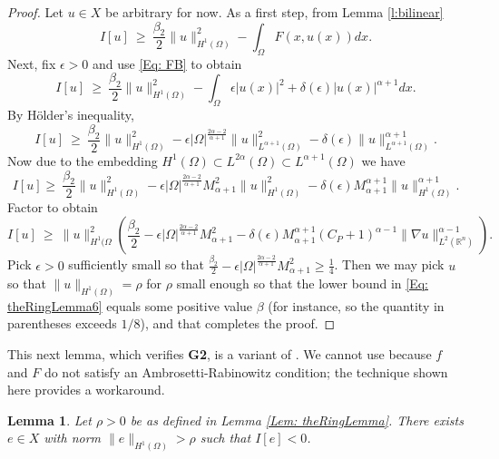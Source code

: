 \documentclass[11pt]{amsart}   	%
\theoremstyle{plain}
\numberwithin{equation}{section}
\newtheorem{lemma}[thm]{Lemma}
\def\al{\alpha}
\def\be{\beta}
\def\de{\delta}
\def\ep{\epsilon}
\def\Om{\Omega}
\def\R{\mathbb{R}}
\def\grad{\nabla}
\begin{document}
\begin{proof}
    Let $u \in X$ be arbitrary for now. As a first step, from Lemma \ref{l:bilinear}
\begin{equation}\label{Eq: theRingLemma1}
    I[u] \ \geq \ \frac{\beta_2}{2}\| u\|^2_{H^1(\Omega)} - \int_{\Om}F(x, u(x))dx.
\end{equation}
Next, fix $\ep > 0$ and use \eqref{Eq: FB} to obtain
\begin{equation}\label{Eq: theRingLemma2}
    I[u] \ \geq \ \frac{\beta_2}{2}\| u\|^2_{H^1(\Omega)} - \int_{\Om}\ep|u(x)|^2 + \de(\ep)|u(x)|^{\al + 1}dx.
\end{equation}
By H{\"o}lder's inequality,
\begin{equation}\label{Eq: theRingLemma3}
    I[u] \ \geq \ \frac{\beta_2}{2}\| u\|^2_{H^1(\Omega)} - \ep|\Om|^{\frac{2\al - 2}{\al + 1}}\|u\|^2_{L^{\al + 1}(\Om)} - \de(\ep)\|u\|^{\al + 1}_{L^{\al + 1}(\Om)}.
\end{equation}
Now due to the embedding $H^1(\Om) \subset L^{2\al}(\Om) \subset L^{\al + 1}(\Om)$ we have
\begin{equation}\label{Eq: theRingLemma4}
    I[u] \geq \ \frac{\beta_2}{2}\| u\|^2_{H^1(\Omega)} - \ep|\Om|^{\frac{2\al - 2}{\al + 1}}M^2_{\al + 1}\|u\|^2_{H^1(\Om)} - \de(\ep)M^{\al + 1}_{\al + 1}\|u\|^{\al + 1}_{H^1(\Om)}.
\end{equation}
Factor to obtain
\begin{equation}\label{Eq: theRingLemma6}
    I[u] \ \geq \ \| u\|^2_{H^1(\Omega}\left(\frac{\beta_2}{2}- \ep|\Om|^{\frac{2\al - 2}{\al + 1}}M^2_{\al + 1} - \de(\ep)M^{\al + 1}_{\al + 1}(C_P + 1)^{\al - 1}\|\grad u\|^{\al - 1}_{L^2(\R^n)}\right).
\end{equation}
Pick $\ep > 0$ sufficiently small so that $\frac{\beta_2}{2}- \ep|\Om|^{\frac{2\al - 2}{\al + 1}}M^2_{\al + 1}\geq \frac{1}{4}$. Then we may pick $u$ so that $\| u\|_{H^1(\Omega)} = \rho$ for $\rho$ small enough so that the lower bound in \eqref{Eq: theRingLemma6} equals some positive value $\be$ (for instance, so the quantity in parentheses exceeds $1/8$), and that completes the proof.
\end{proof}

This next lemma, which verifies \textbf{G2}, is a variant of \cite[Proposition 10]{servadei2012mountain}. We cannot use \cite[Lemma 4]{servadei2012mountain} because $f$ and $F$ do not satisfy an Ambrosetti-Rabinowitz condition; the technique shown here provides a workaround.

\begin{lemma}\label{Lem: coercivityLemH^1}
Let $\rho > 0$ be as defined in Lemma \ref{Lem: theRingLemma}.
There exists $e \in X$ with norm $\| e\|_{H^1(\Omega)} > \rho$ such that $I[e] < 0$. 
\end{lemma}
\end{document}
